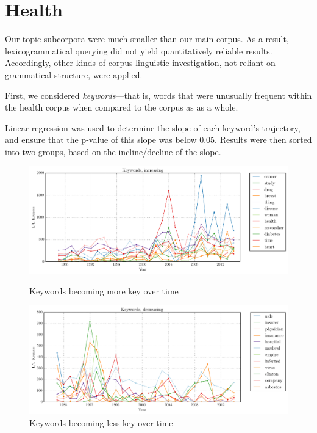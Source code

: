 \section{Health}

    Our topic subcorpora were much smaller than our main corpus. As a result, lexicogrammatical querying did not yield quantitatively reliable results. Accordingly, other kinds of corpus linguistic investigation, not reliant on grammatical structure, were applied. 

    First, we considered \emph{keywords}---that is, words that were unusually frequent within the health corpus when compared to the corpus as as a whole.

    Linear regression was used to determine the slope of each keyword's trajectory, and ensure that the p-value of this slope was below 0.05. Results were then sorted into two groups, based on the incline\slash decline of the slope.

    \begin{figure}[htb!]
    \centering
    \begin{minipage}{.48\textwidth}
    \centering
    \includegraphics[width=.95\textwidth]{../images/keywords-increasing.png}
    \caption{Keywords becoming more key over time}
    \label{fig:key-inc}
    \end{minipage}%
    \begin{minipage}{.48\textwidth}
    \centering
    \includegraphics[width=.95\textwidth]{../images/keywords-decreasing.png}
    \caption{Keywords becoming less key over time}
    \label{fig:key-dec}
    \end{minipage}
    \end{figure}

